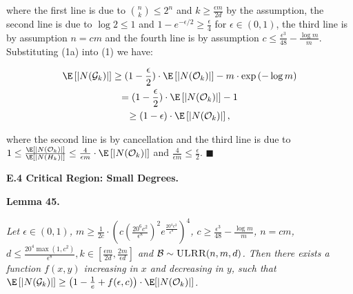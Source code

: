 \documentclass[10pt,a4paper]{article}
\begin{document}
where the first line is due to $\binom{n}{k}\leq 2^{n}$ and $k\geq\frac{\epsilon m}{2d}$ by the assumption, the second line is due to $\log{2}\leq 1$ and $1-e^{-\epsilon/2}\geq\frac{\epsilon}{4}$ for $\epsilon\in(0,1)$, the third line is by assumption $n=cm$ and the fourth line is by assumption $c\leq\frac{\epsilon^{3}}{48}-\frac{\log{m}}{m}$.
Substituting (1a) into (1) we have:\par


\[\begin{gathered}
\displaystyle\E\left[|N(\mathcal{G}_{k})|\right] \displaystyle\geq(1-\frac{\epsilon}{2})\cdot\E\left[|N(\mathcal{O}_{k})|\right]-m\cdot\exp\left(-\log{m}\right) \\
\displaystyle=(1-\frac{\epsilon}{2})\cdot\E\left[|N(\mathcal{O}_{k})|\right]-1 \\
\displaystyle\geq\left(1-\epsilon\right)\cdot\E\left[|N(\mathcal{O}_{k})|\right],
\end{gathered}\]


where the second line is by cancellation and the third line is due to $1\leq\frac{\E\left[|N(\mathcal{O}_{k})|\right]}{\E\left[|N(H_{k})|\right]}\leq\frac{4}{\epsilon m}\cdot\E\left[|N(\mathcal{O}_{k})|\right]$ and $\frac{4}{\epsilon m}\leq\frac{\epsilon}{2}$.
\ensuremath{\blacksquare}\par






\par\medskip\noindent\textbf{E.4 Critical Region: Small Degrees.}\par





\par\medskip\noindent\textbf{\textbf{Lemma 45}\textbf{.}}\par



\emph{Let $\epsilon\in(0,1)$, $m\geq\frac{1}{2c}\cdot\left(c\left(\frac{20^{6}c^{2}}{\epsilon^{8}}\right)^{2}e^{\frac{20^{4}c^{3}}{\epsilon^{8}}}\right)^{4}$, $c\geq\frac{\epsilon^{3}}{48}-\frac{\log{m}}{m}$, $n=cm$, $d\leq\frac{20^{4}\max(1,c^{2})}{\epsilon^{8}},k\in[\frac{\epsilon m}{2d},\frac{2m}{\epsilon d}]$ and $\mathcal{B}\sim\textsc{ULRR}(n,m,d)$.
Then there exists a function $f(x,y)$ increasing in $x$ and decreasing in $y$, such that $\E\left[|N(\mathcal{G}_{k})|\right]\geq\left(1-\frac{1}{e}+f(\epsilon,c)\right)\cdot\E[|N(\mathcal{O}_{k})|]$.}\par
\end{document}

